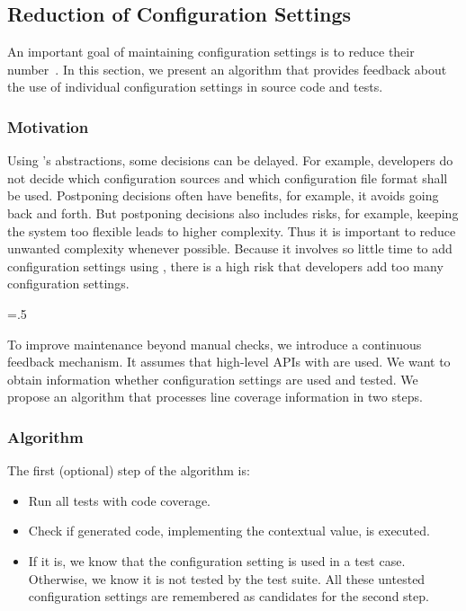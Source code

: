 \subsection{Reduction of Configuration Settings}

An important goal of maintaining configuration settings is to reduce their number~\cite{xu2015hey}.
In this section, we present an algorithm that provides feedback about the use of individual configuration settings in source code and tests.

\subsubsection{Motivation}

Using \elektra{}'s abstractions, some decisions can be delayed.
For example, developers do not decide which configuration sources and which configuration file format shall be used.
Postponing decisions often have benefits, for example, it avoids going back and forth.
But postponing decisions also includes risks, for example, keeping the system too flexible leads to higher complexity.
Thus it is important to reduce unwanted complexity whenever possible.
Because it involves so little time to add configuration settings using \elektra{}, there is a high risk that developers add too many configuration settings.%
{\parfillskip=0pt \emergencystretch=.5\textwidth \par}

To improve maintenance beyond manual checks, we introduce a continuous feedback mechanism.
It assumes that high-level APIs with  are used.
We want to obtain information whether configuration settings are used and tested.
We propose an algorithm that processes line coverage information in two steps.

\subsubsection{Algorithm}

The first (optional) step of the algorithm is:
\begin{itemize}
\item Run all tests with code coverage.
\item Check if generated code, implementing the contextual value, is executed.
\item If it is, we know that the configuration setting is used in a test case.
Otherwise, we know it is not tested by the test suite.
All these untested configuration settings are remembered as candidates for the second step.
\end{itemize}

